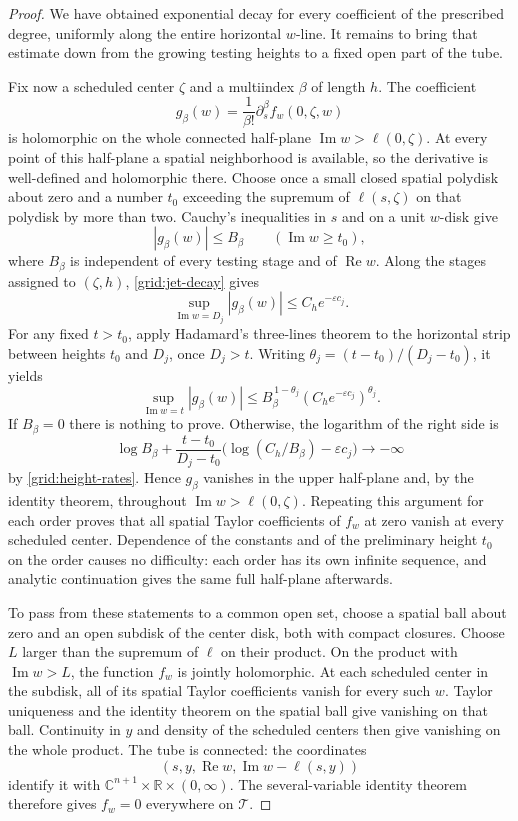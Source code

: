 \begin{proof}
We have obtained exponential decay for every coefficient of the
prescribed degree, uniformly along the entire horizontal $w$-line.
It remains to bring that estimate down from the growing testing heights
to a fixed open part of the tube.

Fix now a scheduled center $\zeta$ and a multiindex $\beta$ of
length $h$.  The coefficient
\[
 g_\beta(w)=\frac1{\beta!}
       \partial_s^\beta f_w(0,\zeta,w)
\]
is holomorphic on the whole connected half-plane
$\operatorname{Im}w>\ell(0,\zeta)$.  At every point of this
half-plane a spatial neighborhood is available, so the derivative
is well-defined and holomorphic there.  Choose once a small
closed spatial polydisk about zero and a number $t_0$ exceeding
the supremum of $\ell(s,\zeta)$ on that polydisk by more than two.
Cauchy's inequalities in $s$ and on a unit $w$-disk give
\[
 |g_\beta(w)|\le B_\beta
 \qquad (\operatorname{Im}w\ge t_0),
\]
where $B_\beta$ is independent of every testing stage and of
$\operatorname{Re}w$.  Along the stages assigned to $(\zeta,h)$,
\eqref{grid:jet-decay} gives
\[
 \sup_{\operatorname{Im}w=D_j}|g_\beta(w)|
       \le C_h e^{-\varepsilon c_j}.
\]
For any fixed $t>t_0$, apply Hadamard's three-lines theorem
\cite[Theorem~7.13]{Tropp2022} to the horizontal strip between heights
$t_0$ and $D_j$, once $D_j>t$.
Writing $\theta_j=(t-t_0)/(D_j-t_0)$, it yields
\[
 \sup_{\operatorname{Im}w=t}|g_\beta(w)|
 \le B_\beta^{\,1-\theta_j}
       (C_h e^{-\varepsilon c_j})^{\theta_j}.
\]
If $B_\beta=0$ there is nothing to prove.  Otherwise, the
logarithm of the right side is
\[
 \log B_\beta+
 \frac{t-t_0}{D_j-t_0}
    \bigl(\log(C_h/B_\beta)-\varepsilon c_j\bigr)
       \longrightarrow-\infty
\]
by \eqref{grid:height-rates}.  Hence $g_\beta$ vanishes in the
upper half-plane and, by the identity theorem, throughout
$\operatorname{Im}w>\ell(0,\zeta)$.  Repeating this argument for
each order proves that all spatial Taylor coefficients of $f_w$
at zero vanish at every scheduled center.  Dependence of the
constants and of the preliminary height $t_0$ on the order causes
no difficulty: each order has its own infinite sequence, and
analytic continuation gives the same full half-plane afterwards.

To pass from these statements to a common open set, choose a
spatial ball about zero and an open subdisk of the center disk,
both with compact closures.  Choose $L$ larger than the supremum
of $\ell$ on their product.  On the product with
$\operatorname{Im}w>L$, the function $f_w$ is jointly holomorphic.
At each scheduled center in the subdisk, all of its spatial
Taylor coefficients vanish for every such $w$.  Taylor uniqueness
and the identity theorem on the spatial ball give vanishing on
that ball.  Continuity in $y$ and density of the scheduled centers
then give vanishing on the whole product.  The tube is connected:
the coordinates
\[
 (s,y,\operatorname{Re}w,
        \operatorname{Im}w-\ell(s,y))
\]
identify it with
$\mathbb C^{n+1}\times\mathbb R\times(0,\infty)$.
The several-variable identity theorem therefore gives $f_w=0$
everywhere on $\mathcal T$.


\end{proof}
